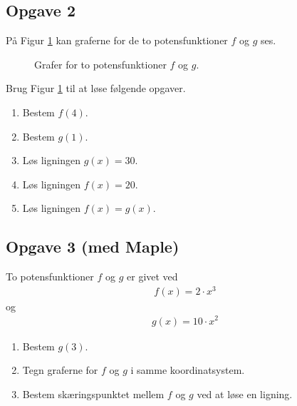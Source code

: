 \subsection*{Opgave 2}
På Figur \ref{fig:opgavegrafer} kan graferne for de to potensfunktioner $f$ og $g$ ses. 
\begin{figure}[H]
	\center
	\caption{Grafer for to potensfunktioner $f$ og $g$.}
	\label{fig:opgavegrafer}
\end{figure}
Brug Figur \ref{fig:opgavegrafer} til at løse følgende opgaver.
\begin{enumerate}[label=\roman*)]
	\item Bestem $f(4)$.
	\item Bestem $g(1)$.
	\item Løs ligningen $g(x) = 30$.
	\item Løs ligningen $f(x) = 20$.
	\item Løs ligningen $f(x) = g(x)$.
\end{enumerate}

\subsection*{Opgave 3 (med Maple)}
To potensfunktioner $f$ og $g$ er givet ved
\begin{align*}
	f(x) = 2\cdot x^3
\end{align*}
og 
\begin{align*}
	g(x) = 10 \cdot x^2
\end{align*}

\begin{enumerate}[label=\roman*)]
	\item Bestem $g(3)$.
	\item Tegn graferne for $f$ og $g$ i samme koordinatsystem.
	\item Bestem skæringspunktet mellem $f$ og $g$ ved at løse en ligning. 
\end{enumerate}

